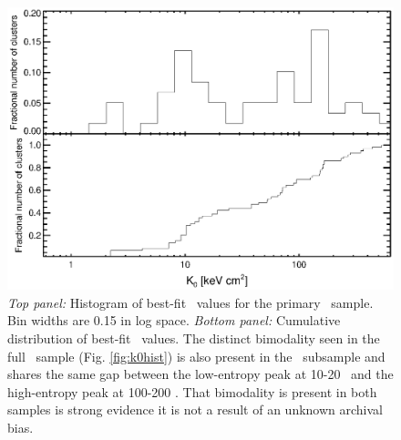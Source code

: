 
\clearpage
\begin{figure}[htp]
  \begin{center}
    \begin{minipage}[htp]{0.9\linewidth}
      \includegraphics*[width=\textwidth, trim=20mm 10mm 10mm 10mm, clip]{hifl_k0hist.eps}
      \caption{{\it{Top panel:}} Histogram of best-fit \kna\ values
      for the primary \hifl\ sample. Bin widths are 0.15 in log space.
      {\it{Bottom panel:}} Cumulative distribution of best-fit \kna\
      values. The distinct bimodality seen in the full \accept\ sample
      (Fig. \ref{fig:k0hist}) is also present in the \hifl\ subsample
      and shares the same gap between the low-entropy peak at 10-20 \ent\ and the high-entropy peak at 100-200 \ent. That
      bimodality is present in both samples is strong evidence it is
      not a result of an unknown archival bias.}
      \label{fig:hiflk0}
    \end{minipage}
  \end{center}
\end{figure}

